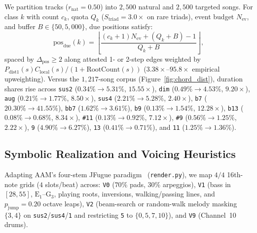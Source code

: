 We partition tracks ($r_{\text{nat}} = 0.50$) into $2{,}500$ natural and $2{,}500$ targeted songs. For class $k$ with count $c_k$, quota $Q_k$ ($S_{\text{triad}} = 3.0\times$ on rare triads), event budget $N_{\text{ev}}$, and buffer $B \in \{50, 5{,}000\}$, due positions satisfy:
\begin{equation}\label{eq:quota_due}
  \text{pos}_{\text{due}}(k) = \left\lfloor \frac{(c_k + 1) N_{\text{ev}} + (Q_k + B) - 1}{Q_k + B} \right\rfloor,
\end{equation}
spaced by $\Delta_{\text{pos}} \ge 2$ along attested 1- or 2-step edges weighted by $P_{\text{dist1}}(s) C_{\text{local}}(s) / (1 + \text{RootCount}(s))$ ($3.38\times$--$95.8\times$ empirical upweighting). Versus the $1{,}217$-song corpus (Figure~\ref{fig:chord_dist}), duration shares rise across {\small\texttt{sus2}} ($0.34\% \!\to\! 5.31\%$, $15.55\times$), {\small\texttt{dim}} ($0.49\% \!\to\! 4.53\%$, $9.20\times$), {\small\texttt{aug}} ($0.21\% \!\to\! 1.77\%$, $8.50\times$), {\small\texttt{sus4}} ($2.21\% \!\to\! 5.28\%$, $2.40\times$), {\small\texttt{b7}} ($20.30\% \!\to\! 41.55\%$), {\small\texttt{bb7}} ($1.62\% \!\to\! 3.61\%$), {\small\texttt{b9}} ($0.13\% \!\to\! 1.54\%$, $12.28\times$), {\small\texttt{b13}} ($0.08\% \!\to\! 0.68\%$, $8.34\times$), {\small\texttt{\#11}} ($0.13\% \!\to\! 0.92\%$, $7.12\times$), {\small\texttt{\#9}} ($0.56\% \!\to\! 1.25\%$, $2.22\times$), {\small\texttt{9}} ($4.90\% \!\to\! 6.27\%$), {\small\texttt{13}} ($0.41\% \!\to\! 0.71\%$), and {\small\texttt{11}} ($1.25\% \!\to\! 1.36\%$).

\subsection{Symbolic Realization and Voicing Heuristics}\label{subsec:voicing}

Adapting AAM's four-stem JFugue paradigm~\cite{ostermann2023aam} ({\small\texttt{render.py}}), we map $4/4$ 16th-note grids ($4$ slots/beat) across: {\small\texttt{V0}} ($70\%$ pads, $30\%$ arpeggios), {\small\texttt{V1}} (bass in $[28, 55]$, $\text{E}_1$--$\text{G}_3$, playing roots, inversions, walking/passing lines, and $p_{\text{jump}} = 0.20$ octave leaps), {\small\texttt{V2}} (beam-search or random-walk melody masking $\{3, 4\}$ on {\small\texttt{sus2}}/{\small\texttt{sus4}}/{\small\texttt{1}} and restricting {\small\texttt{5}} to $\{0, 5, 7, 10\}$), and {\small\texttt{V9}} (Channel~10 drums).

